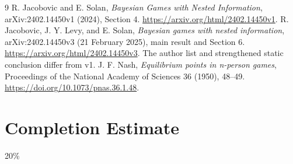 \documentclass[11pt]{article}
\theoremstyle{remark}\newtheorem{remark}[theorem]{Remark}
\begin{document}
\begin{thebibliography}{9}
 R. Jacobovic and E. Solan, \emph{Bayesian Games with Nested Information}, arXiv:2402.14450v1 (2024), Section 4. \url{https://arxiv.org/html/2402.14450v1}.
 R. Jacobovic, J. Y. Levy, and E. Solan, \emph{Bayesian games with nested information}, arXiv:2402.14450v3 (21 February 2025), main result and Section 6. \url{https://arxiv.org/html/2402.14450v3}. The author list and strengthened static conclusion differ from v1.
 J. F. Nash, \emph{Equilibrium points in n-person games}, Proceedings of the National Academy of Sciences 36 (1950), 48--49. \url{https://doi.org/10.1073/pnas.36.1.48}.
\end{thebibliography}

\section{Completion Estimate}
20\%
\end{document}
